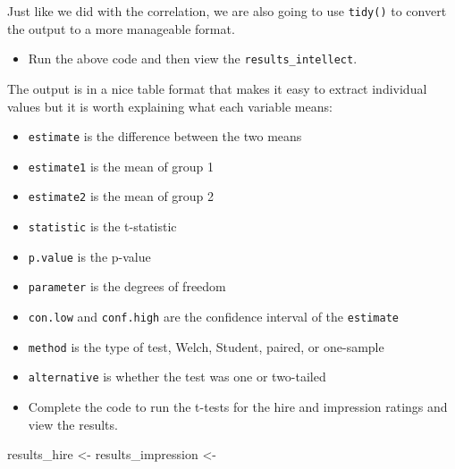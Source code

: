 \documentclass[]{book}
\newenvironment{Shaded}{\begin{snugshade}}{\end{snugshade}}
\newcommand{\NormalTok}[1]{#1}
\newcommand{\StringTok}[1]{\textcolor[rgb]{0.31,0.60,0.02}{#1}}
\providecommand{\tightlist}{%
  \setlength{\itemsep}{0pt}\setlength{\parskip}{0pt}}
\begin{document}
Just like we did with the correlation, we are also going to use \texttt{tidy()} to convert the output to a more manageable format.

\begin{itemize}
\tightlist
\item
  Run the above code and then view the \texttt{results\_intellect}.
\end{itemize}

The output is in a nice table format that makes it easy to extract individual values but it is worth explaining what each variable means:

\begin{itemize}
\item
  \texttt{estimate} is the difference between the two means
\item
  \texttt{estimate1} is the mean of group 1\\
\item
  \texttt{estimate2} is the mean of group 2\\
\item
  \texttt{statistic} is the t-statistic\\
\item
  \texttt{p.value} is the p-value\\
\item
  \texttt{parameter} is the degrees of freedom\\
\item
  \texttt{con.low} and \texttt{conf.high} are the confidence interval of the \texttt{estimate}
\item
  \texttt{method} is the type of test, Welch, Student, paired, or one-sample
\item
  \texttt{alternative} is whether the test was one or two-tailed
\item
  Complete the code to run the t-tests for the hire and impression ratings and view the results.
\end{itemize}

\begin{Shaded}
\begin{Highlighting}[]
\NormalTok{results_hire <-}\StringTok{ }
\NormalTok{results_impression <-}\StringTok{ }
\end{Highlighting}
\end{Shaded}
\end{document}
